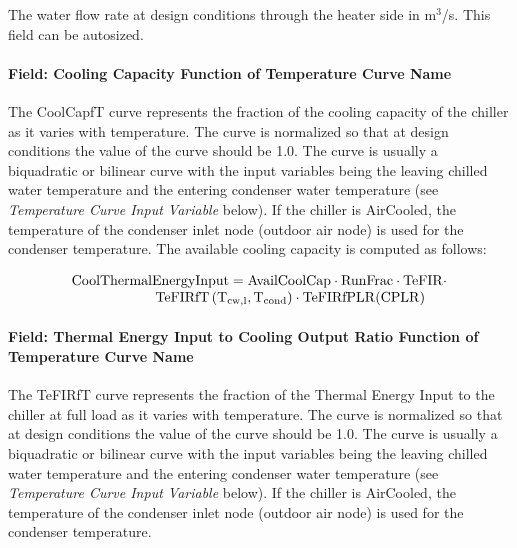 The water flow rate at design conditions through the heater side in m\(^{3}\)/s. This field can be autosized.

\paragraph{Field: Cooling Capacity Function of Temperature Curve Name}\label{field-cooling-capacity-function-of-temperature-curve-name-3}

The CoolCapfT curve represents the fraction of the cooling capacity of the chiller as it varies with temperature. The curve is normalized so that at design conditions the value of the curve should be 1.0. The curve is usually a biquadratic or bilinear curve with the input variables being the leaving chilled water temperature and the entering condenser water temperature (see \emph{Temperature Curve Input Variable} below). If the chiller is AirCooled, the temperature of the condenser inlet node (outdoor air node) is used for the condenser temperature. The available cooling capacity is computed as follows:

\begin{equation}
\begin{array}{l}
\rm{CoolThermalEnergyInput} = \rm{AvailCoolCap} \cdot \rm{RunFrac} \cdot \rm{TeFIR} \cdot \\
\quad \quad \quad \quad \quad \quad \rm{TeFIRfT} \left( T_{cw,l}, T_{cond} \right) \cdot \rm{TeFIRfPLR}( \rm{CPLR} )
\end{array}
\end{equation}

\paragraph{Field: Thermal Energy Input to Cooling Output Ratio Function of Temperature Curve Name}\label{field-thermal-energy-input-to-cooling-output-ratio-function-of-temperature-curve-name}

The TeFIRfT curve represents the fraction of the Thermal Energy Input to the chiller at full load as it varies with temperature. The curve is normalized so that at design conditions the value of the curve should be 1.0. The curve is usually a biquadratic or bilinear curve with the input variables being the leaving chilled water temperature and the entering condenser water temperature (see \emph{Temperature Curve Input Variable} below). If the chiller is AirCooled, the temperature of the condenser inlet node (outdoor air node) is used for the condenser temperature.

